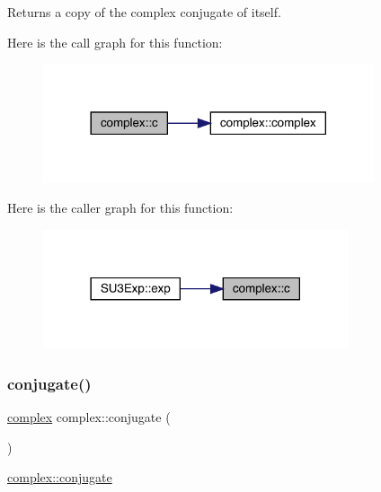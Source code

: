 \begin{DoxyReturn}{Returns}
a copy of the complex conjugate of itself. 
\end{DoxyReturn}
Here is the call graph for this function\+:
\nopagebreak
\begin{figure}[H]
\begin{center}
\leavevmode
\includegraphics[width=276pt]{classcomplex_a4741546b5617d11e87ee7831067c84c5_cgraph}
\end{center}
\end{figure}
Here is the caller graph for this function\+:
\nopagebreak
\begin{figure}[H]
\begin{center}
\leavevmode
\includegraphics[width=254pt]{classcomplex_a4741546b5617d11e87ee7831067c84c5_icgraph}
\end{center}
\end{figure}
\mbox{\label{classcomplex_af21a3dae4577a3aab8e1105a1b919b81}} 
\subsubsection{\texorpdfstring{conjugate()}{conjugate()}}
{\footnotesize\ttfamily \mbox{\hyperlink{classcomplex}{complex}} complex\+::conjugate (\begin{DoxyParamCaption}{ }\end{DoxyParamCaption})}



\mbox{\hyperlink{classcomplex_af21a3dae4577a3aab8e1105a1b919b81}{complex\+::conjugate}} 

